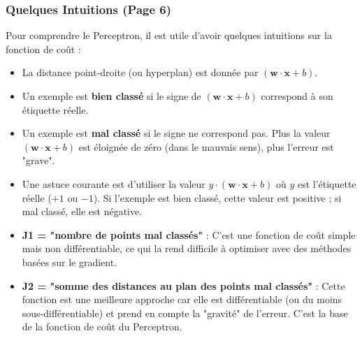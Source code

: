 \documentclass{article}
\begin{document}
\subsubsection{Quelques Intuitions (Page 6)}
Pour comprendre le Perceptron, il est utile d'avoir quelques intuitions sur la fonction de coût :
\begin{itemize}
    \item La distance point-droite (ou hyperplan) est donnée par $(\mathbf{w} \cdot \mathbf{x} + b)$.
    \item Un exemple est \textbf{bien classé} si le signe de $(\mathbf{w} \cdot \mathbf{x} + b)$ correspond à son étiquette réelle.
    \item Un exemple est \textbf{mal classé} si le signe ne correspond pas. Plus la valeur $(\mathbf{w} \cdot \mathbf{x} + b)$ est éloignée de zéro (dans le mauvais sens), plus l'erreur est "grave".
    \item Une astuce courante est d'utiliser la valeur $y \cdot (\mathbf{w} \cdot \mathbf{x} + b)$ où $y$ est l'étiquette réelle ($+1$ ou $-1$). Si l'exemple est bien classé, cette valeur est positive ; si mal classé, elle est négative.
    \item \textbf{J1 = "nombre de points mal classés" } : C'est une fonction de coût simple mais non différentiable, ce qui la rend difficile à optimiser avec des méthodes basées sur le gradient.
    \item \textbf{J2 = "somme des distances au plan des points mal classés" } : Cette fonction est une meilleure approche car elle est différentiable (ou du moins sous-différentiable) et prend en compte la "gravité" de l'erreur. C'est la base de la fonction de coût du Perceptron.
\end{itemize}
\end{document}
